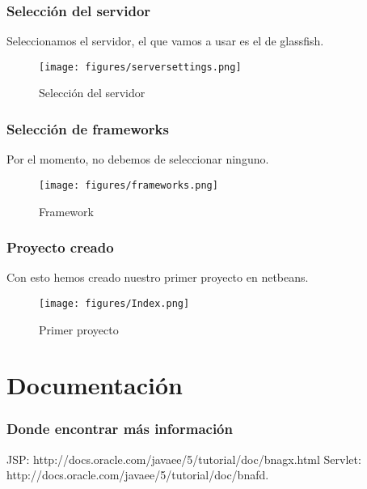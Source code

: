 \documentclass{beamer}
\begin{document}
\begin{frame}
  \frametitle{Selección del servidor}
  Seleccionamos el servidor, el que vamos a usar es el de glassfish.
  \begin{figure}[ht]
    \centering
    \texttt{[image: figures/serversettings.png]}
    \caption{\label{fig:serversettings} Selección del servidor}
  \end{figure}

\end{frame}

\begin{frame}
  \frametitle{Selección de frameworks}
  Por el momento, no debemos de seleccionar ninguno.
  \begin{figure}[ht]
    \centering
    \texttt{[image: figures/frameworks.png]}
    \caption{\label{fig:frameworks} Framework}
  \end{figure}

\end{frame}
\begin{frame}
  \frametitle{Proyecto creado}
  Con esto hemos creado nuestro primer proyecto en netbeans.

  \begin{figure}[ht]
    \centering
    \texttt{[image: figures/Index.png]}
    \caption{\label{fig:Proyecto} Primer proyecto}
  \end{figure}

\end{frame}

\section{Documentación}

\begin{frame}
  \frametitle{Donde encontrar más información}
    JSP: http://docs.oracle.com/javaee/5/tutorial/doc/bnagx.html
    Servlet: http://docs.oracle.com/javaee/5/tutorial/doc/bnafd.
\end{frame}
\end{document}
